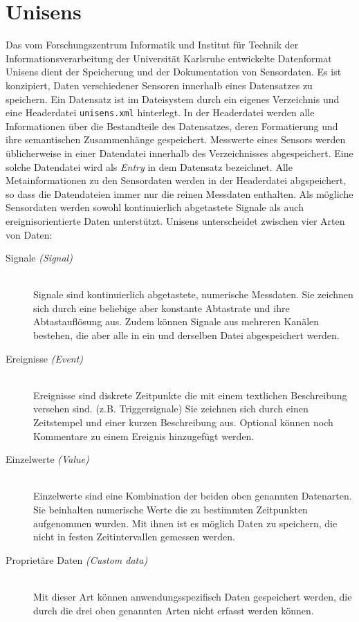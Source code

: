 \section{Unisens}

Das vom Forschungszentrum Informatik und Institut f\"ur Technik der Informationsverarbeitung der Universit\"at Karlsruhe entwickelte Datenformat Unisens dient der Speicherung und der Dokumentation von Sensordaten.
Es ist konzipiert, Daten verschiedener Sensoren innerhalb eines Datensatzes zu speichern.
Ein Datensatz ist im Dateisystem durch ein eigenes Verzeichnis und eine Headerdatei \verb|unisens.xml| hinterlegt.
In der Headerdatei werden alle Informationen \"uber die Bestandteile des Datensatzes, deren Formatierung und ihre semantischen Zusammenh\"ange gespeichert.
Messwerte eines Sensors werden \"ublicherweise in einer Datendatei innerhalb des Verzeichnisses abgespeichert.
Eine solche Datendatei wird als \emph{Entry} in dem Datensatz bezeichnet.
Alle Metainformationen zu den Sensordaten werden in der Headerdatei abgspeichert, so dass die Datendateien immer nur die reinen Messdaten enthalten.
Als m\"ogliche Sensordaten werden sowohl kontinuierlich abgetastete Signale als auch ereignisorientierte Daten unterst\"utzt.
Unisens unterscheidet zwischen vier Arten von Daten:
\begin{description}
	\item[Signale \emph{(Signal)}] \hfill \\
		Signale sind kontinuierlich abgetastete, numerische Messdaten.
		Sie zeichnen sich durch eine beliebige aber konstante Abtastrate und ihre Abtastaufl\"osung aus.
		Zudem k\"onnen Signale aus mehreren Kan\"alen bestehen, die aber alle in ein und derselben Datei abgespeichert werden.
	\item[Ereignisse \emph{(Event)}] \hfill \\
		Ereignisse sind diskrete Zeitpunkte die mit einem textlichen Beschreibung versehen sind. (z.B. Triggersignale)
		Sie zeichnen sich durch einen Zeitstempel und einer kurzen Beschreibung aus.
		Optional k\"onnen noch Kommentare zu einem Ereignis hinzugef\"ugt werden.
	\item[Einzelwerte \emph{(Value)}] \hfill \\
		Einzelwerte sind eine Kombination der beiden oben genannten Datenarten.
		Sie beinhalten numerische Werte die zu bestimmten Zeitpunkten aufgenommen wurden.
		Mit ihnen ist es m\"oglich Daten zu speichern, die nicht in festen Zeitintervallen gemessen werden.
	\item[Propriet\"are Daten \emph{(Custom data)}] \hfill \\
		Mit dieser Art k\"onnen anwendungsspezifisch Daten gespeichert werden, die durch die drei oben genannten Arten nicht erfasst werden k\"onnen.
\end{description}

